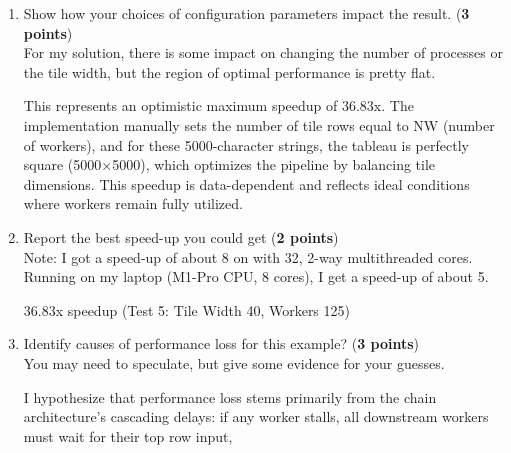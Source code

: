 \documentclass{article}
\newenvironment{answer}
{\par\color{blue}}
{\normalfont\par}
\begin{document}
\begin{enumerate}
\begin{enumerate}
\begin{enumerate}
\begin{answer}
\begin{verbatim}
=== Test 11: Tile Width 2500 ===
Workers (NW): 2
Parallel: mean = 3.161660 s, std = 0.399689 s
Speedup: 1.28x
                                  \end{verbatim}
                              \end{answer}
                        \item Show how your choices of configuration parameters impact the result. (\textbf{3 points})\\
                              For my solution, there is some impact on changing the number of processes or the tile width,
                              but the region of optimal performance is pretty flat.
                              \begin{answer}
                                  This represents an optimistic maximum speedup of 36.83x. The implementation manually
                                  sets the number of tile rows equal to NW (number of workers), and for these
                                  5000-character strings, the tableau is perfectly square (5000×5000), which
                                  optimizes the pipeline by balancing tile dimensions. This speedup is data-dependent
                                  and reflects ideal conditions where workers remain fully utilized.
                              \end{answer}
                        \item Report the best speed-up you could get (\textbf{2 points})\\
                              Note: I got a speed-up of about 8 on  with 32, 2-way multithreaded cores.
                              Running on my laptop (M1-Pro CPU, 8 cores), I get a speed-up of about 5.
                              \begin{answer}
                                  36.83x speedup (Test 5: Tile Width 40, Workers 125)
                              \end{answer}
                        \item Identify causes of performance loss for this example? (\textbf{3 points})\\
                              You may need to speculate, but give some evidence for your guesses.
                              \begin{answer}
                                  I hypothesize that performance loss stems primarily from the chain architecture's
                                  cascading delays: if any worker stalls, all downstream workers must wait for their top row input,

\end{answer}
\end{enumerate}
\end{enumerate}
\end{enumerate}
\end{document}

